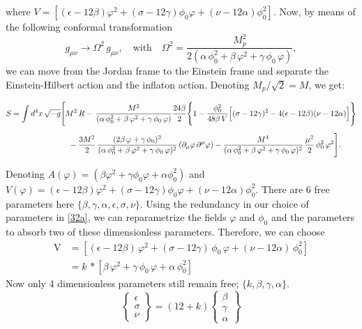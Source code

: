 \documentclass[aps,prd,reprint,preprintnumbers,showpacs,floatfix,nofootinbib,superscript address]{revtex4-2}
\begin{document}
where $V = [(\epsilon - 12\beta) \varphi^2 + (\sigma - 12\gamma) \phi_0 \varphi + (\nu - 12\alpha)\phi^2_0]$. Now, by means of the following conformal transformation 
\[
g_{\mu\nu}\rightarrow \Omega^2\,g_{\mu\nu},\quad\text{with}\quad \Omega^2 = \frac{M_p^2}{2(\alpha\,\phi_0^2+\beta\,\varphi^2+\gamma\,\phi_0\,\varphi)},
\]
we can move from the Jordan frame to the Einstein frame and separate the Einstein-Hilbert action and the inflaton action. Denoting $M_p/\sqrt{2} = M$, we get:
\begin{widetext}
\begin{subequations}\label{33a}
\begin{align}
S = \int d^4x\, \sqrt{-g} &\Biggl[ M^2\, R - \,\frac{M^2}{(\alpha\,\phi_0^2+\beta\,\varphi^2+\gamma\,\phi_0\,\varphi)}
\frac{24\beta}{2}\Biggl\{1 - \frac{\phi_0^2}{48\beta\,V}\Bigl[(\sigma-12\gamma)^2-4(\epsilon-12\beta)(\nu-12\alpha)\Bigr]\Biggr\} \nonumber\\[2mm]
&\quad - \frac{3M^2}{2}\,\frac{(2\beta\,\varphi+\gamma\,\phi_0)^2}{(\alpha\,\phi_0^2+\beta\,\varphi^2+\gamma\,\phi_0\,\varphi)^2}\,(\partial_{\mu}\varphi\,\partial^{\mu}\varphi) - \frac{M^4}{(\alpha\,\phi_0^2+\beta\,\varphi^2+\gamma\,\phi_0\,\varphi)^2}\,\frac{\mu^2}{2}\,\phi_0^2\,\varphi^2 \Biggr].
\end{align}
\end{subequations}
\end{widetext}
Denoting $A(\varphi) = (\beta\varphi^2+\gamma\phi_0\varphi+\alpha\phi_0^2)$ and $V(\varphi) = (\epsilon - 12\beta) \varphi^2 + (\sigma - 12\gamma) \phi_0  \varphi + (\nu - 12\alpha)\phi^2_0$. There are 6 free parameters here $\{ \beta, \gamma, \alpha , \epsilon, \sigma, \nu \}$. Using the redundancy in our choice of parameters in \ref{32a}, we can reparametrize the fields $\varphi$ and $\phi_0$ and the parameters to absorb two of these dimensionless parameters. Therefore, we can choose
\[
\begin{split}
\text{V} &= \left[(\epsilon - 12\beta)\,\varphi^2 + (\sigma - 12\gamma)\,\phi_0\,\varphi + (\nu - 12\alpha)\,\phi_0^2\right] \\
         &= k\,*\left[\beta\,\varphi^2 + \gamma\,\phi_0\,\varphi + \alpha\,\phi_0^2\right]
\end{split}
\]
Now only 4 dimensionless parameters still remain free; $\{k, \beta, \gamma, \alpha \}$.
\begin{equation}
    \begin{Bmatrix}
        \epsilon \\ \sigma \\ \nu 
    \end{Bmatrix}
    = (12+k)
    \begin{Bmatrix}
        \beta \\ \gamma \\ \alpha
    \end{Bmatrix}
\end{equation}
\end{document}
